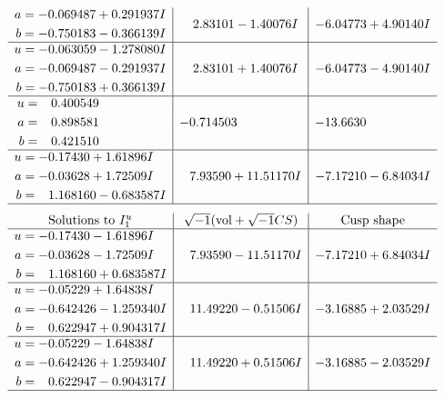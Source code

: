 \documentclass[1p]{elsarticle_modified}
\theoremstyle{definition}
\newcommand{\I}{\sqrt{-1}}
\begin{document}
$$\begin{array}{c|c|c}
\begin{aligned}
a &= -0.069487 + 0.291937 I \\
b &= -0.750183 - 0.366139 I\end{aligned}
 & \phantom{-}2.83101 - 1.40076 I & -6.04773 + 4.90140 I \\ \hline\begin{aligned}
u &= -0.063059 - 1.278080 I \\
a &= -0.069487 - 0.291937 I \\
b &= -0.750183 + 0.366139 I\end{aligned}
 & \phantom{-}2.83101 + 1.40076 I & -6.04773 - 4.90140 I \\ \hline\begin{aligned}
u &= \phantom{-}0.400549\phantom{ +0.000000I} \\
a &= \phantom{-}0.898581\phantom{ +0.000000I} \\
b &= \phantom{-}0.421510\phantom{ +0.000000I}\end{aligned}
 & -0.714503\phantom{ +0.000000I} & -13.6630\phantom{ +0.000000I} \\ \hline\begin{aligned}
u &= -0.17430 + 1.61896 I \\
a &= -0.03628 + 1.72509 I \\
b &= \phantom{-}1.168160 - 0.683587 I\end{aligned}
 & \phantom{-}7.93590 + 11.51170 I & -7.17210 - 6.84034 I\\
 \hline 
 \end{array}$$\newpage$$\begin{array}{c|c|c}  
\text{Solutions to }I^u_{1}& \I (\text{vol} + \sqrt{-1}CS) & \text{Cusp shape}\\
 \hline 
\begin{aligned}
u &= -0.17430 - 1.61896 I \\
a &= -0.03628 - 1.72509 I \\
b &= \phantom{-}1.168160 + 0.683587 I\end{aligned}
 & \phantom{-}7.93590 - 11.51170 I & -7.17210 + 6.84034 I \\ \hline\begin{aligned}
u &= -0.05229 + 1.64838 I \\
a &= -0.642426 - 1.259340 I \\
b &= \phantom{-}0.622947 + 0.904317 I\end{aligned}
 & \phantom{-}11.49220 - 0.51506 I & -3.16885 + 2.03529 I \\ \hline\begin{aligned}
u &= -0.05229 - 1.64838 I \\
a &= -0.642426 + 1.259340 I \\
b &= \phantom{-}0.622947 - 0.904317 I\end{aligned}
 & \phantom{-}11.49220 + 0.51506 I & -3.16885 - 2.03529 I\\
 \hline 
 \end{array}$$\newpage\newpage\renewcommand{\arraystretch}{1}
\end{document}
